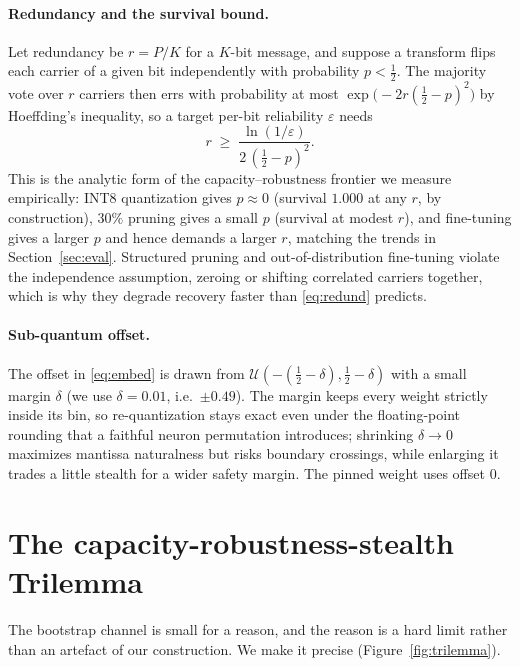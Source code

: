 \documentclass[a4paper,fleqn]{cas-dc}
\theoremstyle{plain}
\theoremstyle{remark}
\begin{document}
\paragraph{Redundancy and the survival bound.} Let redundancy be $r=P/K$ for a
$K$-bit message, and suppose a transform flips each carrier of a given bit independently
with probability $p<\tfrac12$. The majority vote over $r$ carriers then errs with
probability at most $\exp\!\big(-2r(\tfrac12-p)^2\big)$ by Hoeffding's inequality, so a
target per-bit reliability $\varepsilon$ needs
\begin{equation}\label{eq:redund}
r \;\ge\; \frac{\ln(1/\varepsilon)}{2\,(\tfrac12-p)^2}.
\end{equation}
This is the analytic form of the capacity--robustness frontier we measure empirically:
INT8 quantization gives $p\approx0$ (survival $1.000$ at any $r$, by construction),
$30\%$ pruning gives a small $p$ (survival at modest $r$), and fine-tuning gives a larger
$p$ and hence demands a larger $r$, matching the trends in
Section~\ref{sec:eval}. Structured pruning and out-of-distribution fine-tuning violate
the independence assumption, zeroing or shifting correlated carriers together, which is
why they degrade recovery faster than \eqref{eq:redund} predicts.

\paragraph{Sub-quantum offset.} The offset in \eqref{eq:embed} is drawn from
$\mathcal{U}(-(\tfrac12-\delta),\tfrac12-\delta)$ with a small margin $\delta$ (we use
$\delta=0.01$, i.e.\ $\pm0.49$). The margin keeps every weight strictly inside its bin, so
re-quantization stays exact even under the floating-point rounding that a faithful neuron
permutation introduces; shrinking $\delta\to0$ maximizes mantissa naturalness but risks
boundary crossings, while enlarging it trades a little stealth for a wider safety margin.
The pinned weight uses offset $0$.

\section{The capacity-robustness-stealth Trilemma}\label{sec:trilemma}
The bootstrap channel is small for a reason, and the reason is a hard limit rather than
an artefact of our construction. We make it precise (Figure~\ref{fig:trilemma}).
\end{document}
